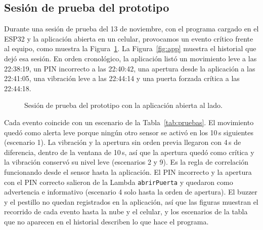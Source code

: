 \documentclass[manuscript,screen,nonacm]{acmart}
\begin{document}
\subsection{Sesión de prueba del prototipo}
Durante una sesión de prueba del 13 de noviembre, con el programa cargado en el ESP32 y la aplicación abierta en un celular, provocamos un evento crítico frente al equipo, como muestra la Figura~\ref{fig:prueba}. La Figura~\ref{fig:app} muestra el historial que dejó esa sesión. En orden cronológico, la aplicación listó un movimiento leve a las 22:38:19, un PIN incorrecto a las 22:40:42, una apertura desde la aplicación a las 22:41:05, una vibración leve a las 22:44:14 y una puerta forzada crítica a las 22:44:18.

\begin{figure}[htbp]
\centering
{}
\caption{Sesión de prueba del prototipo con la aplicación abierta al lado.}
\label{fig:prueba}
\end{figure}

Cada evento coincide con un escenario de la Tabla~\ref{tab:pruebas}. El movimiento quedó como alerta leve porque ningún otro sensor se activó en los 10\,s siguientes (escenario 1). La vibración y la apertura sin orden previa llegaron con 4\,s de diferencia, dentro de la ventana de 10\,s, así que la apertura quedó como crítica y la vibración conservó su nivel leve (escenarios 2 y 9). Es la regla de correlación funcionando desde el sensor hasta la aplicación. El PIN incorrecto y la apertura con el PIN correcto salieron de la Lambda \texttt{abrirPuerta} y quedaron como advertencia e informativo (escenario 4 solo hasta la orden de apertura). El buzzer y el pestillo no quedan registrados en la aplicación, así que las figuras muestran el recorrido de cada evento hasta la nube y el celular, y los escenarios de la tabla que no aparecen en el historial describen lo que hace el programa.
\end{document}
